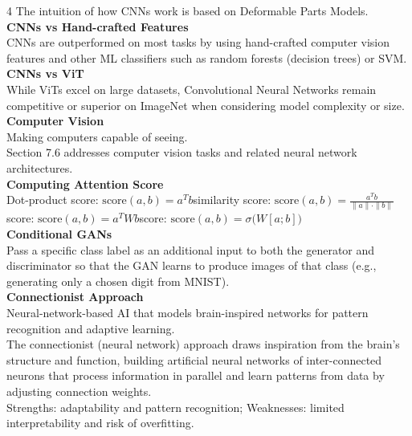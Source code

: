 \documentclass[8pt]{extarticle}
\begin{document}
\begin{multicols}{4}
The intuition of how CNNs work is based on Deformable Parts Models.\\
\vspace{2pt}\textbf{CNNs vs Hand-crafted Features}\\
CNNs are outperformed on most tasks by using hand-crafted computer vision features and other ML classifiers such as random forests (decision trees) or SVM.\\
\vspace{2pt}\textbf{CNNs vs ViT}\\
While ViTs excel on large datasets, Convolutional Neural Networks remain competitive or superior on ImageNet when considering model complexity or size.\\
\vspace{2pt}\textbf{Computer Vision}\\
Making computers capable of seeing.\\
Section 7.6 addresses computer vision tasks and related neural network architectures.\\
\vspace{2pt}\textbf{Computing Attention Score}\\
Dot-product score: $ \text{score}(a, b) = a^{T} b $\Cosine similarity score: $ \text{score}(a, b) = \frac{a^{T} b}{\|a\| \cdot \|b\|} $\Bilinear score: $ \text{score}(a, b) = a^{T} W b $\MLP score: $ \text{score}(a, b) = \sigma\big( W [a; b] \big) $\\
\vspace{2pt}\textbf{Conditional GANs}\\
Pass a specific class label as an additional input to both the generator and discriminator so that the GAN learns to produce images of that class (e.g., generating only a chosen digit from MNIST).\\
\vspace{2pt}\textbf{Connectionist Approach}\\
Neural-network-based AI that models brain-inspired networks for pattern recognition and adaptive learning.\\
The connectionist (neural network) approach draws inspiration from the brain's structure and function, building artificial neural networks of inter-connected neurons that process information in parallel and learn patterns from data by adjusting connection weights.\\
Strengths: adaptability and pattern recognition; Weaknesses: limited interpretability and risk of overfitting.\\


\end{multicols}
\end{document}

